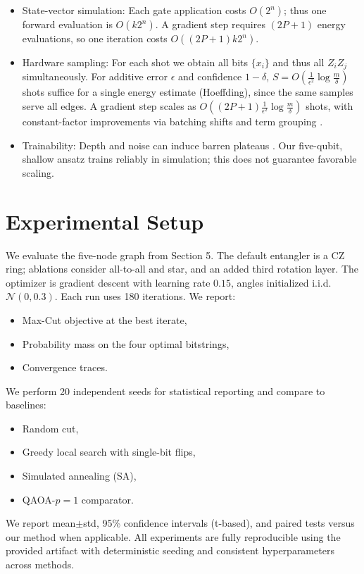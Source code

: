 \begin{itemize}
    \item State-vector simulation: Each gate application costs $O(2^n)$; thus one forward evaluation is $O(k2^n)$. A gradient step requires $(2P{+}1)$ energy evaluations, so one iteration costs $O((2P{+}1)k2^n)$.
    \item Hardware sampling: For each shot we obtain all bits $\{x_i\}$ and thus all $Z_iZ_j$ simultaneously. For additive error $\epsilon$ and confidence $1{-}\delta$, $S=O\!\left(\tfrac{1}{\epsilon^2}\log\tfrac{m}{\delta}\right)$ shots suffice for a single energy estimate (Hoeffding), since the same samples serve all edges. A gradient step scales as $O\!\left((2P{+}1)\tfrac{1}{\epsilon^2}\log\tfrac{m}{\delta}\right)$ shots, with constant-factor improvements via batching shifts and term grouping \cite{huggins2021efficient,verteletskyi2020measurement}.
    \item Trainability: Depth and noise can induce barren plateaus \cite{mcclean2018barren,arrasmith2021trainability,wang2021noiseplateaus}. Our five-qubit, shallow ansatz trains reliably in simulation; this does not guarantee favorable scaling.
\end{itemize}

\section{Experimental Setup}
We evaluate the five-node graph from Section 5. The default entangler is a CZ ring; ablations consider all-to-all and star, and an added third rotation layer. The optimizer is gradient descent with learning rate $0.15$, angles initialized i.i.d. $\mathcal{N}(0,0.3)$. Each run uses 180 iterations. We report:
\begin{itemize}
    \item Max-Cut objective at the best iterate,
    \item Probability mass on the four optimal bitstrings,
    \item Convergence traces.
\end{itemize}
We perform 20 independent seeds for statistical reporting and compare to baselines:
\begin{itemize}
    \item Random cut,
    \item Greedy local search with single-bit flips,
    \item Simulated annealing (SA),
    \item QAOA-$p{=}1$ comparator.
\end{itemize}
We report mean$\pm$std, 95\% confidence intervals (t-based), and paired tests versus our method when applicable. All experiments are fully reproducible using the provided artifact with deterministic seeding and consistent hyperparameters across methods.

